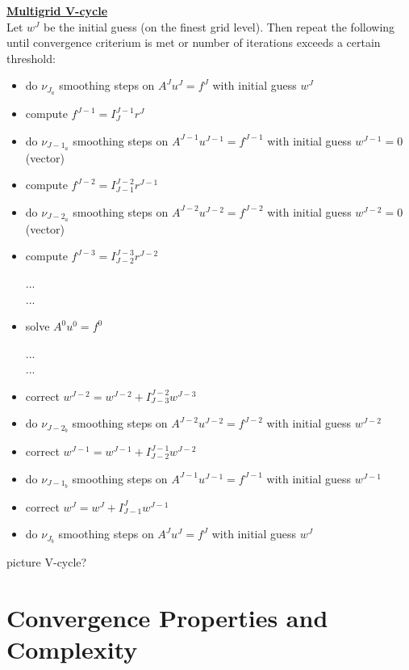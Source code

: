 \documentclass[../draft_1.tex]{subfiles}
\begin{document}
\begin{framed}
	\underline{\textbf{Multigrid V-cycle}} 
	\smallskip 
	\\
	Let $w^J$ be the initial guess (on the finest grid level). Then repeat the following until convergence criterium is met or number of iterations exceeds a certain threshold:
	
	\begin{itemize}
		\item do $\nu_{J_a}$ smoothing steps on $A^J u^J = f^J$ with initial guess $w^J$
		\item compute $f^{J-1} = I_{J}^{J-1} r^J$
		\item do $\nu_{J-1_a}$ smoothing steps on $A^{J-1} u^{J-1} = f^{J-1}$ with initial guess $w^{J-1} = 0$ (vector)
		\item compute $f^{J-2} = I_{J-1}^{J-2} r^{J-1}$
		\item do $\nu_{J-2_a}$ smoothing steps on $A^{J-2} u^{J-2} = f^{J-2}$ with initial guess $w^{J-2} = 0$ (vector)
		\item compute $f^{J-3} = I_{J-2}^{J-3} r^{J-2}$
		
		... \\
		...
		
		\item solve $A^0 u^0 = f^0$
		
		... \\
		...
		
		\item correct $w^{J-2} = w^{J-2} + I_{J-3}^{J-2} w^{J-3}$
		\item do $\nu_{J-2_b}$ smoothing steps on $A^{J-2} u^{J-2} = f^{J-2}$ with initial guess $w^{J-2}$
		\item correct $w^{J-1} = w^{J-1} + I_{J-2}^{J-1} w^{J-2}$
		\item do $\nu_{{J-1}_b}$ smoothing steps on $A^{J-1} u^{J-1} = f^{J-1}$ with initial guess $w^{J-1}$		
		\item correct $w^{J} = w^{J} + I_{J-1}^{J} w^{J-1}$
		\item do $\nu_{J_b}$ smoothing steps on $A^{J} u^{J} = f^{J}$ with initial guess $w^{J}$
	\end{itemize}	
\end{framed}


picture V-cycle?



\section{Convergence Properties and Complexity}
\end{document}
